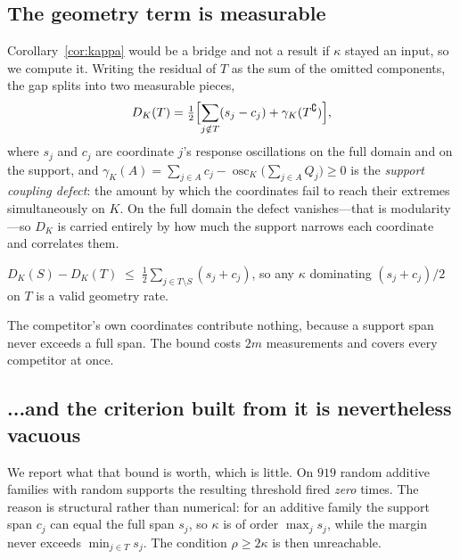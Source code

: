 \subsection{The geometry term is measurable}

Corollary~\ref{cor:kappa} would be a bridge and not a result if $\kappa$ stayed an input,
so we compute it. Writing the residual of $T$ as the sum of the omitted components, the gap
splits into two measurable pieces,
\begin{equation}
D_{K}(T)=\tfrac12\Bigl[\sum_{j\notin T}(s_{j}-c_{j})+\gamma_{K}(T^{\complement})\Bigr],
\label{eq:gapsplit}
\end{equation}
where $s_{j}$ and $c_{j}$ are coordinate $j$'s response oscillations on the full domain and
on the support, and
$\gamma_{K}(A)=\sum_{j\in A}c_{j}-\operatorname{osc}_{K}\bigl(\sum_{j\in A}Q_{j}\bigr)\ge0$
is the \emph{support coupling defect}: the amount by which the coordinates fail to reach
their extremes simultaneously on $K$. On the full domain the defect vanishes---that is
modularity---so $D_{K}$ is carried entirely by how much the support narrows each coordinate
and correlates them.


\begin{theorem}
\label{thm:kappabound}
$\displaystyle D_{K}(S)-D_{K}(T)\;\le\;\tfrac12\sum_{j\in T\setminus S}(s_{j}+c_{j})$,
so any $\kappa$ dominating $(s_{j}+c_{j})/2$ on $T$ is a valid geometry rate.
\end{theorem}


The competitor's own coordinates contribute nothing, because a support span never exceeds a
full span. The bound costs $2m$ measurements and covers every competitor at once.

\subsection{...and the criterion built from it is nevertheless vacuous}

We report what that bound is worth, which is little. On $919$ random additive families with
random supports the resulting threshold fired \emph{zero} times. The reason is structural
rather than numerical: for an additive family the support span $c_{j}$ can equal the full
span $s_{j}$, so $\kappa$ is of order $\max_{j}s_{j}$, while the margin never exceeds
$\min_{j\in T}s_{j}$. The condition $\rho\ge2\kappa$ is then unreachable. \NUM{}

